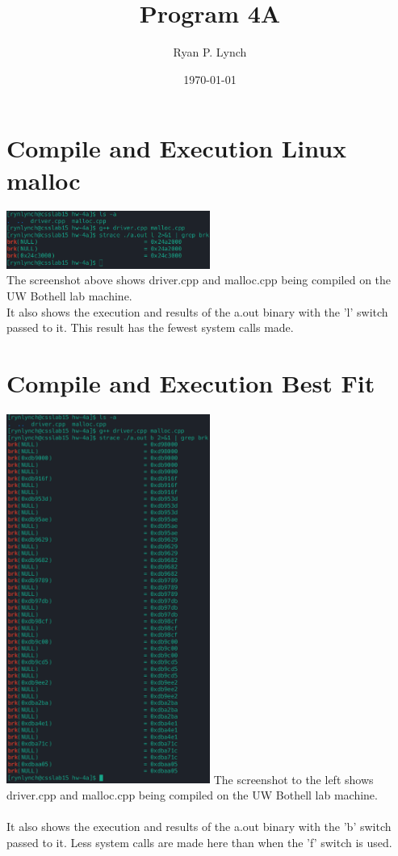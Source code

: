 \documentclass[a4paper,11pt,twoside]{article}
\author{Ryan P. Lynch}
\date{\today}
\title{Program 4A}
\begin{document}
\maketitle

\section*{Compile and Execution Linux malloc}
\label{sec:orgee21255}
\noindent
\includegraphics[width=0.5\textwidth]{linux_malloc}\\[0pt]
The screenshot above shows driver.cpp and malloc.cpp being compiled on the UW Bothell lab machine.\\[0pt]
It also shows the execution and results of the a.out binary with the 'l' switch passed to it. This result has the fewest system calls made.\\[0pt]
\section*{Compile and Execution Best Fit}
\label{sec:org0b4feeb}
\begin{multicols}{2}
\noindent
\includegraphics[width=0.5\textwidth]{ryan_b-malloc}
\noindent
The screenshot to the left shows driver.cpp and malloc.cpp being compiled on the UW Bothell lab machine.\\
\\
It also shows the execution and results of the a.out binary with the 'b' switch passed to it. Less system calls are made here than when the 'f' switch is used.\\
\end{multicols}
\end{document}
